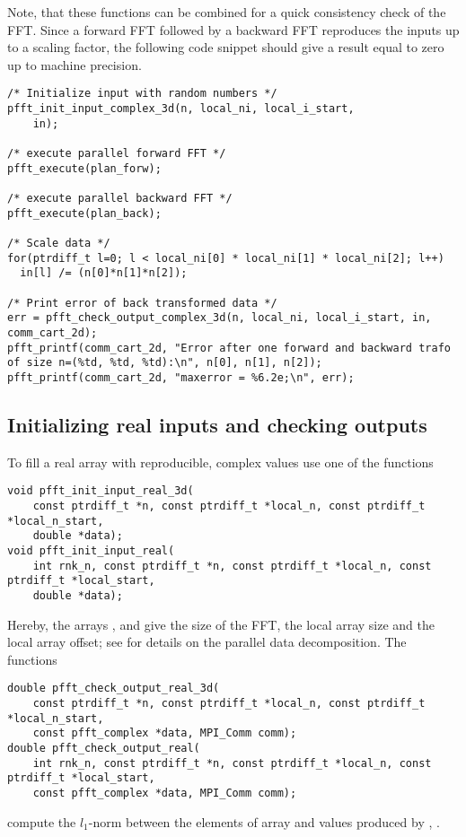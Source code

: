 Note, that these functions can be combined for a quick consistency check of the FFT.
Since a forward FFT followed by a backward FFT reproduces the inputs up to a scaling factor, the following code snippet should give a result equal to zero up to machine precision.
\begin{lstlisting}
/* Initialize input with random numbers */
pfft_init_input_complex_3d(n, local_ni, local_i_start,
    in);

/* execute parallel forward FFT */
pfft_execute(plan_forw);

/* execute parallel backward FFT */
pfft_execute(plan_back);

/* Scale data */
for(ptrdiff_t l=0; l < local_ni[0] * local_ni[1] * local_ni[2]; l++)
  in[l] /= (n[0]*n[1]*n[2]);

/* Print error of back transformed data */
err = pfft_check_output_complex_3d(n, local_ni, local_i_start, in, comm_cart_2d);
pfft_printf(comm_cart_2d, "Error after one forward and backward trafo of size n=(%td, %td, %td):\n", n[0], n[1], n[2]);
pfft_printf(comm_cart_2d, "maxerror = %6.2e;\n", err);
\end{lstlisting}




\subsection{Initializing real inputs and checking outputs}\label{sec:init-data-3d-r2r}
To fill a real array  with reproducible, complex values use one of the functions
\begin{lstlisting}
void pfft_init_input_real_3d(
    const ptrdiff_t *n, const ptrdiff_t *local_n, const ptrdiff_t *local_n_start,
    double *data);
void pfft_init_input_real(
    int rnk_n, const ptrdiff_t *n, const ptrdiff_t *local_n, const ptrdiff_t *local_start,
    double *data);
\end{lstlisting}
Hereby, the arrays ,  and  give the size of the FFT, the local array size and the local array offset;
see \cite{sec:par-data-decomp} for details on the parallel data decomposition.
The functions
\begin{lstlisting}
double pfft_check_output_real_3d(
    const ptrdiff_t *n, const ptrdiff_t *local_n, const ptrdiff_t *local_n_start,
    const pfft_complex *data, MPI_Comm comm);
double pfft_check_output_real(
    int rnk_n, const ptrdiff_t *n, const ptrdiff_t *local_n, const ptrdiff_t *local_start,
    const pfft_complex *data, MPI_Comm comm);
\end{lstlisting}
compute the $l_1$-norm between the elements of array  and values produced by , .

